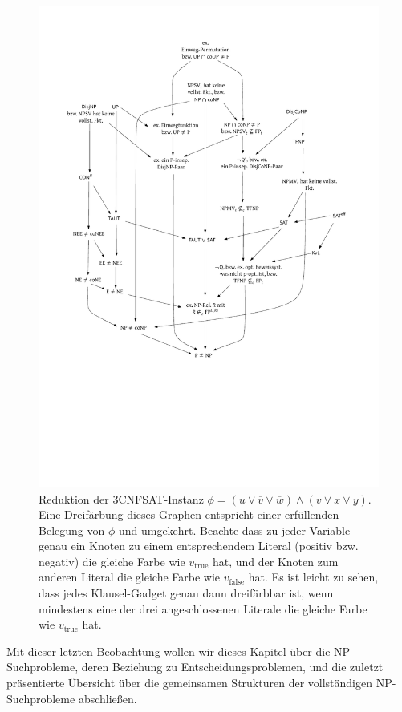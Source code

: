 \begin{figure}[t]
    \begin{minipage}[t][7.9cm][t]{\textwidth}
    \centering\includegraphics[page=6]{figures.pdf}
\end{minipage}\par
    \caption{Reduktion der 3CNFSAT-Instanz $\phi=(u\lor \overline{v} \lor \overline{w}) \land (v\lor x\lor y)$. 
        Eine Dreifärbung dieses Graphen entspricht einer erfüllenden Belegung von $\phi$ und umgekehrt.
    Beachte dass zu jeder Variable genau ein Knoten zu einem entsprechendem Literal (positiv bzw. negativ) die gleiche Farbe wie $v_{\text{true}}$ hat, und der Knoten zum anderen Literal die gleiche Farbe wie $v_{\text{false}}$ hat. Es ist leicht zu sehen, dass jedes Klausel-Gadget genau dann dreifärbbar ist, wenn mindestens eine der drei angeschlossenen Literale die gleiche Farbe wie $v_{\text{true}}$ hat.}\label{fig:3col}
\end{figure}

Mit dieser letzten Beobachtung wollen wir dieses Kapitel über die NP-Suchprobleme, deren Beziehung zu Entscheidungsproblemen, und die zuletzt präsentierte Übersicht über die gemeinsamen Strukturen der vollständigen NP-Suchprobleme abschließen. 



